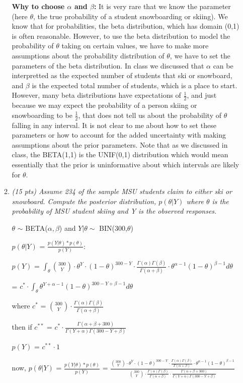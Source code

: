 \documentclass{article}\usepackage[]{graphicx}\usepackage[]{color}
\begin{document}
\begin{enumerate}
\begin{enumerate}
\newpage
{\bf Why to choose $\alpha$ and $\beta$:}
It is very rare that we know the parameter (here $\theta$, the true probability of a student snowboarding or skiing). We know that for probabilities, the beta distribution, which has domain (0,1) is often reasonable. However, to use the beta distribution to model the probability of $\theta$ taking on certain values, we have to make more assumptions about the probability distribution of $\theta$, we have to set the parameters of the beta distribution. In class we discussed that $\alpha$ can be interpretted as the expected number of students that ski or snowboard, and $\beta$ is the expected total number of students, which is a place to start. However, many beta distributions have expectations of $\frac{1}{2}$, and just because we may expect the probability of a person skiing or snowboarding to be $\frac{1}{2}$, that does not tell us about the probability of $\theta$ falling in any interval. It is not clear to me about how to set these parameters or how to account for the added uncertainty with making assumptions about the prior parameters. Note that as we discussed in class, the BETA(1,1) is the UNIF(0,1) distribution which would mean essentially that the prior is uninformative about which intervals are likely for $\theta$.

\item %
{\it (15 pts) Assume 234 of the sample MSU students claim to either ski or snowboard. Compute the posterior distribution, $p(\theta|Y)$ where $\theta$ is the probability of MSU student skiing and Y is the observed responses. }

$\theta$ $\sim$ BETA($\alpha,\beta$) and  $Y|\theta \sim$ BIN(300,$\theta$)

$p(\theta|Y)$ = $\frac{p(Y|\theta)*p(\theta)}{p(Y)}$:

$p(Y)$ = $\int_{\mathcal{\theta}} \binom{300}{Y} \cdot \theta^{Y} \cdot (1-\theta)^{300-Y} \cdot \frac{\Gamma(\alpha)\Gamma(\beta)}{\Gamma(\alpha+\beta)} \cdot \theta^{\alpha-1}(1-\theta)^{\beta-1} d{\theta}$

= $c^{*} \cdot \int_{\mathcal{\theta}} \theta^{Y+\alpha-1}(1-\theta)^{300-Y+\beta-1} d{\theta}$

where $c^{*}$ = $\binom{300}{Y} \cdot \frac{\Gamma(\alpha)\Gamma(\beta)}{\Gamma(\alpha+\beta)}$

then if $c^{**}$ = $c^{*} \cdot \frac{\Gamma(\alpha+\beta+300)}{\Gamma(Y+\alpha)\Gamma(300-Y+\beta)}$

$p(Y)$ = $c^{**} \cdot 1$

now, $p(\theta|Y)$ = $\frac{p(Y|\theta)*p(\theta)}{p(Y)}$ = $\frac{\binom{300}{Y} \cdot \theta^{Y} \cdot (1-\theta)^{300-Y} \cdot \frac{\Gamma(\alpha)\Gamma(\beta)}{\Gamma(\alpha+\beta)} \cdot \theta^{\alpha-1}(1-\theta)^{\beta-1}}{\binom{300}{Y} \cdot \frac{\Gamma(\alpha)\Gamma(\beta)}{\Gamma(\alpha+\beta)} \cdot \frac{\Gamma(\alpha+\beta+300)}{\Gamma(Y+\alpha)\Gamma(300-Y+\beta)}}$


\end{enumerate}
\end{enumerate}
\end{document}

